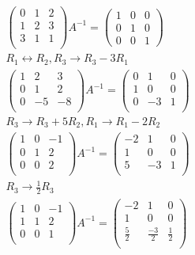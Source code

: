 \documentclass{article}
\begin{document}
\begin{gather*}
\begin{pmatrix}
0 & 1 & 2\\
1 & 2 & 3\\
3 & 1 & 1\\
\end{pmatrix}A^{-1} = \begin{pmatrix}
1 & 0 & 0\\
0 & 1 & 0\\
0 & 0 & 1
\end{pmatrix}\\
R_1 \leftrightarrow R_2 , R_3 \rightarrow R_3 - 3R_1\\
\begin{pmatrix}
1 & 2 & 3\\ 
0 & 1 & 2\\
0 & -5 & -8\\
\end{pmatrix} A^{-1} = \begin{pmatrix}
0 & 1 & 0\\
1 & 0 & 0\\
0 & -3 & 1 \\
\end{pmatrix}\\
R_3 \rightarrow R_3 + 5R_2, R_1 \rightarrow R_1 - 2R_2\\
\begin{pmatrix}
1 & 0 & -1\\
0 & 1 & 2\\
0 & 0 & 2\\
\end{pmatrix} A^{-1} = \begin{pmatrix}
-2 & 1 & 0\\
1 & 0 & 0 \\
5 & -3 & 1\\
\end{pmatrix}\\
R_3 \rightarrow \frac{1}{2} R_3\\
\begin{pmatrix}
1 & 0 & -1\\
1 & 1 & 2\\
0 & 0 & 1\\
\end{pmatrix} A^{-1} = \begin{pmatrix}
-2 & 1 & 0 \\
1 & 0 & 0 \\
\frac{5}{2} & \frac{-3}{2} & \frac{1}{2}\\
\end{pmatrix}\\
\end{gather*}
\end{document}
